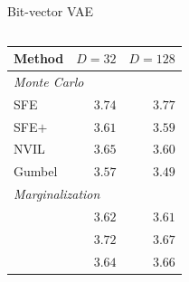 \documentclass[xetex,aspectratio=169,xcolor,professionalfonts,hyperref]{beamer}
\begin{document}
\begin{frame}{Bit-vector VAE}%
    \begin{columns}[T]
    \begin{column}{.53\textwidth}
    \centering\small%
    \begin{tabular}{lrr}
        \toprule
        Method & $D=32$ & $D=128$\\
        \midrule
    \multicolumn{3}{l}{\emph{Monte Carlo}} \\
        SFE & $3.74$ & $3.77$  \\
        SFE$+$ & $3.61$ & $3.59$  \\
        NVIL & $3.65$ & $3.60$ \\
        Gumbel & $3.57$ & $3.49$  \\
    \midrule
    \multicolumn{3}{l}{\emph{Marginalization}} \\
    \color{tVividBlue}{Top-$k$ sparsemax} & $3.62$ & $3.61$  \\
    \color{tVividBlue}{SparseMAP} & $3.72$ & $3.67$  \\
    \color{tVividBlue}{SparseMAP (w/ budget)} & $3.64$ & $3.66$  \\
        \bottomrule
    \end{tabular}
    \end{column}
    \begin{column}{.47\textwidth}
    \centering%
    \only<3>{
        
        }
    \end{column}
    \end{columns}
\end{frame}
\end{document}
